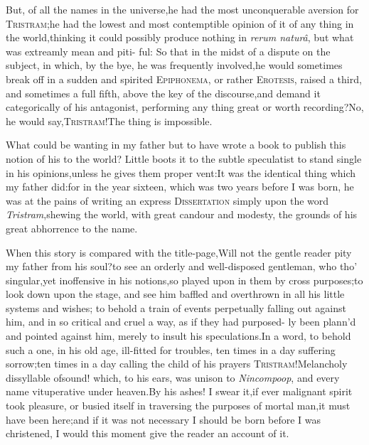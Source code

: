 \documentclass{article}
\begin{document}
But, of all the names in the universe,\break he had the most unconquerable aversion for
\textsc{Tristram};\tsk  he had the lowest and most contemptible opinion
of it of any thing in the world,\tsk  thinking it could possibly produce
nothing in \textit{rerum naturâ}, but what was extreamly mean and piti-
ful: So
that in the midst of a dispute on the subject, in which, by the bye, he was
frequently involved,\tsh  he would sometimes break off in a sudden and
spirited \textsc{Epiphonema}, or rather \textsc{Erotesis}, raised a
third, and sometimes a full fifth, above the key of the
discourse,\tsh  and demand it categorically of his antagonist,
performing any thing great or worth
re\-cording?\tsk  No\tsk, he would
say,\tsk  \textsc{Tri\-stram}!\tsk  The thing is impossible.

What could be wanting in my father but to have wrote a book to
publish this notion of his to the world? Little boots it to the
subtle speculatist to stand single in his opinions,\tsk  unless he
gives them proper vent:\tsk  It was the identical thing which my
father did:\tsk  for in the year sixteen, which was two years
before I was born, he was at the pains of writing an express
\textsc{Dissertation} simply upon the word
\textit{Tristram},\tsk  shewing the world, with great candour and
modesty, the grounds of his great abhorrence to the name.

When this story is compared with the title-page,\tsk  Will not
the gentle reader pity my father from his soul?\tsk  to see an\break
orderly and well-disposed gentleman, who tho’
singular,\tsk  yet inoffensive in his no\-tions,\tsk  so played
upon in them by cross purposes;\tsh  to look down upon
the stage, and see him baffled and overthrown in all his
little systems and wishes; to behold a train of events perpetually
falling out against him, and in so critical and cruel a way, as if
they had purposed- ly been plann’d and pointed ag\-ainst him,
merely to insult his speculations.\tsh  In a word, to
behold such a one, in his old age, ill-fitted for troubles, ten
times in a day suffering sorrow;\tsk  ten times in a day calling
the child of his prayers \textsc{Tristram}!\tsk  Melancholy
dissyllable of\break sound! which, to his ears, was unison to
\textit{Nincompoop}, and every name vituperative under
heaven.\tsh  By his ashes! I swear it,\tsk  if ever
malignant spirit took pleasure, or busied itself in traversing the
purposes of mortal man,\tsk  it must have been here;\tsk  and if
it was not necessary I should be born before I was christened, I
would this moment give the reader an account of it.
\end{document}

